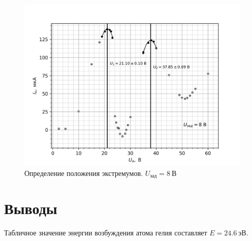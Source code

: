 \documentclass[14pt, a4paper]{report}
\begin{document}
\begin{figure}[H]
\centering
\includegraphics[scale=0.9]{../images/521-7}
\caption{Определение положения экстремумов. $U_{зад}=8\ \text{В}$}
\end{figure}

\section{Выводы}

Табличное значение энергии возбуждения атома гелия составляет $E=24.6\ эВ$. 
\end{document}
